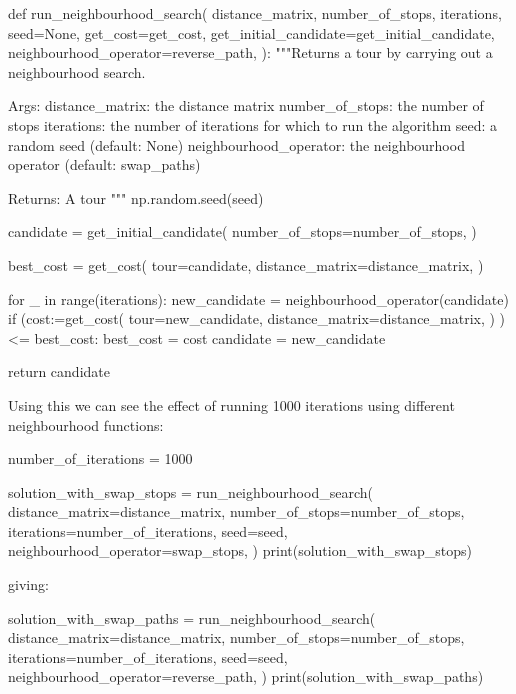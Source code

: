 \begin{pyin}
def run_neighbourhood_search(
    distance_matrix,
    number_of_stops,
    iterations,
    seed=None,
    get_cost=get_cost,
    get_initial_candidate=get_initial_candidate,
    neighbourhood_operator=reverse_path,
):
    """Returns a tour by carrying out a neighbourhood search.

    Args:
        distance_matrix: the distance matrix
        number_of_stops: the number of stops
        iterations: the number of iterations for which to
                    run the algorithm
        seed: a random seed (default: None)
        neighbourhood_operator: the neighbourhood operator
                                (default: swap_paths)

    Returns:
        A tour
    """
    np.random.seed(seed)

    candidate = get_initial_candidate(
        number_of_stops=number_of_stops,
    )

    best_cost = get_cost(
        tour=candidate,
        distance_matrix=distance_matrix,
    )

    for _ in range(iterations):
        new_candidate = neighbourhood_operator(candidate)
        if (cost:=get_cost(
                    tour=new_candidate,
                    distance_matrix=distance_matrix,
                  )
            ) <= best_cost:
            best_cost = cost
            candidate = new_candidate

    return candidate
\end{pyin}

Using this we can see the effect of running 1000 iterations using different
neighbourhood functions:


\begin{pyin}
number_of_iterations = 1000

solution_with_swap_stops = run_neighbourhood_search(
    distance_matrix=distance_matrix,
    number_of_stops=number_of_stops,
    iterations=number_of_iterations,
    seed=seed,
    neighbourhood_operator=swap_stops,
)
print(solution_with_swap_stops)
\end{pyin}

giving:

\begin{pyout}
[0, 7, 6, 2, 8, 5, 3, 1, 9, 12, 11, 4, 10, 0]
\end{pyout}

\begin{pyin}
solution_with_swap_paths = run_neighbourhood_search(
    distance_matrix=distance_matrix,
    number_of_stops=number_of_stops,
    iterations=number_of_iterations,
    seed=seed,
    neighbourhood_operator=reverse_path,
)
print(solution_with_swap_paths)
\end{pyin}


